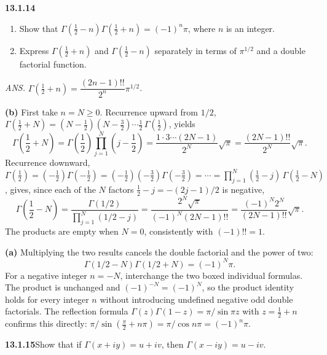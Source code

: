 \par\bigskip
\noindent\textbf{13.1.14}\quad
\begin{enumerate}
\item[(a)] Show that $\Gamma(\frac{1}{2}-n)\Gamma(\frac{1}{2}+n)=(-1)^{n}\pi$,
  where $n$ is an integer.
\item[(b)] Express $\Gamma(\frac{1}{2}+n)$ and $\Gamma(\frac{1}{2}-n)$
  separately in terms of $\pi^{1/2}$ and a double factorial function.
\end{enumerate}
\par\nobreak\hfill\emph{ANS.}\enspace
$\Gamma(\tfrac{1}{2}+n)=\dfrac{(2n-1)!!}{2^{n}}\pi^{1/2}$.
\par\smallskip
{}
\solution
\textbf{(b)} First take $n=N\ge0$.  Recurrence upward from $1/2$,
$\Gamma(\tfrac12+N)=(N-\tfrac12)(N-\tfrac32)\cdots\tfrac12\,
\Gamma(\tfrac12)$, yields
\[
\Gamma\left(\frac12+N\right)
=\Gamma\left(\frac12\right)
 \prod_{j=1}^N\left(j-\frac12\right)
=\frac{1\cdot3\cdots(2N-1)}{2^N}\sqrt\pi
=\boxed{\frac{(2N-1)!!}{2^N}\sqrt\pi}.
\]
Recurrence downward,
$\Gamma(\tfrac12)=(-\tfrac12)\Gamma(-\tfrac12)
=(-\tfrac12)(-\tfrac32)\Gamma(-\tfrac32)=\cdots
=\prod_{j=1}^N(\tfrac12-j)\,\Gamma(\tfrac12-N)$, gives, since each of
the $N$ factors $\tfrac12-j=-(2j-1)/2$ is negative,
\[
\Gamma\left(\frac12-N\right)
=\frac{\Gamma(1/2)}{\prod_{j=1}^N(1/2-j)}
=\frac{2^N\sqrt\pi}{(-1)^N(2N-1)!!}
=\boxed{\frac{(-1)^N2^N}{(2N-1)!!}\sqrt\pi}.
\]
The products are empty when $N=0$, consistently with $(-1)!!=1$.

\textbf{(a)} Multiplying the two results cancels the double
factorial and the power of two:
\[
\boxed{\Gamma(1/2-N)\Gamma(1/2+N)=(-1)^N\pi}.
\]
For a negative integer $n=-N$, interchange the two boxed individual
formulas.  The product is unchanged and $(-1)^{-N}=(-1)^N$, so the
product identity holds for every integer $n$ without introducing
undefined negative odd double factorials.  The reflection formula
$\Gamma(z)\Gamma(1-z)=\pi/\sin\pi z$ with $z=\tfrac12+n$ confirms
this directly: $\pi/\sin(\tfrac\pi2+n\pi)=\pi/\cos n\pi=(-1)^n\pi$.


\par\bigskip
\noindent\textbf{13.1.15}\quad Show that if $\Gamma(x+iy)=u+iv$, then
$\Gamma(x-iy)=u-iv$.

